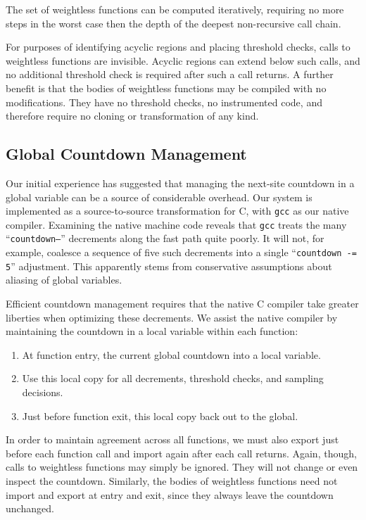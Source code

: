 The set of weightless functions can be computed iteratively, requiring
no more steps in the worst case then the depth of the deepest
non-recursive call chain.

For purposes of identifying acyclic regions and placing threshold
checks, calls to weightless functions are invisible.  Acyclic regions
can extend below such calls, and no additional threshold check is
required after such a call returns.  A further benefit is that the
bodies of weightless functions may be compiled with no modifications.
They have no threshold checks, no instrumented code, and therefore
require no cloning or transformation of any kind.

\subsection{Global Countdown Management}

Our initial experience has suggested that managing the next-site
countdown in a global variable can be a source of considerable
overhead.  Our system is implemented as a source-to-source
transformation for C, with \texttt{gcc} as our native compiler.
Examining the native machine code reveals that \texttt{gcc} treats the
many ``\texttt{countdown--}'' decrements along the fast path quite
poorly.  It will not, for example, coalesce a sequence of five such
decrements into a single ``\texttt{countdown -= 5}'' adjustment.  This
apparently stems from conservative assumptions about aliasing of
global variables.

Efficient countdown management requires that the native C compiler
take greater liberties when optimizing these decrements.  We assist
the native compiler by maintaining the countdown in a local variable
within each function:

\begin{enumerate}
\item At function entry,  the current global countdown
  into a local variable.
\item Use this local copy for all decrements, threshold checks, and
  sampling decisions.
\item Just before function exit,  this local copy back
  out to the global.
\end{enumerate}

In order to maintain agreement across all functions, we must also
export just before each function call and import again after each call
returns.  Again, though, calls to weightless functions may simply be
ignored.  They will not change or even inspect the countdown.
Similarly, the bodies of weightless functions need not import and
export at entry and exit, since they always leave the countdown
unchanged.

